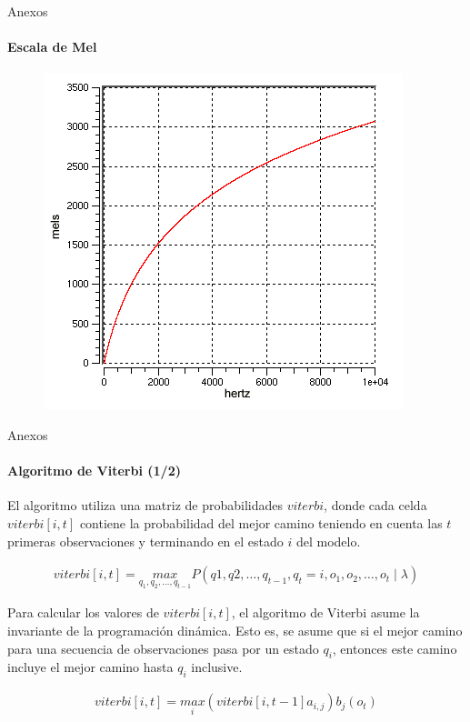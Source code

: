 \begin{frame}[noframenumbering]{Anexos}
\framesubtitle{Escala de Mel}
\begin{figure}[H]
\centering
\includegraphics[width=0.7\linewidth]{./graphics/mel_hz.png}
\end{figure}
\end{frame}

\begin{frame}[noframenumbering]{Anexos}
\framesubtitle{Algoritmo de Viterbi (1/2)}
El algoritmo utiliza una matriz de probabilidades $viterbi$, donde cada celda $viterbi[i,t]$ 
contiene la probabilidad del mejor camino teniendo en cuenta las $t$ primeras observaciones y 
terminando en el estado $i$ del modelo.

\begin{align*}
    viterbi[i,t] = \displaystyle \underset{q_1,q_2,\ldots,q_{t - 1}}{max} P(q1,q2,\ldots,q_{t - 1},
        q_t = i,o_1,o_2,\ldots,o_t \mid \lambda)    
\end{align*} 

Para calcular los valores de $viterbi[i,t]$, el algoritmo de Viterbi asume la invariante de la 
programaci\'on din\'amica. Esto es, se asume que si el mejor camino para una secuencia de observaciones 
pasa por un estado $q_i$, entonces este camino incluye el mejor camino hasta $q_i$ inclusive. 


\begin{align*}
    viterbi[i,t] = \displaystyle \underset{i}{max} (viterbi[i,t-1]a_{i,j})b_j(o_t)
\end{align*}

\end{frame}

